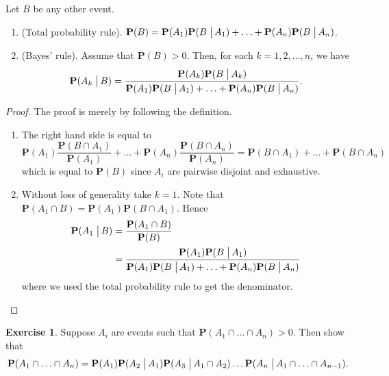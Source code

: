 \documentclass[preprint,  11pt]{amsart}
\theoremstyle{plain} %
\theoremstyle{definition} %
\newtheorem{exercise}[theorem]{Exercise}
\begin{document}
 Let $B$ be any other event.
\begin{enumerate}\setlength\itemsep{6pt}
\item (Total probability rule). $\mathbf{P}(B)=\mathbf{P}(A_{1})\mathbf{P}(B\left.\vphantom{\hbox{\large (}}\right| A_{1})+\ldots +\mathbf{P}(A_{n})\mathbf{P}(B\left.\vphantom{\hbox{\large (}}\right| A_{n})$.
\item (Bayes' rule).  Assume that $\mathbf{P}(B)>0$. Then, for each $k=1,2,\ldots ,n$, we have
$$\mathbf{P}(A_{k}\left.\vphantom{\hbox{\large (}}\right| B)=\frac{\mathbf{P}(A_{k})\mathbf{P}(B\left.\vphantom{\hbox{\large (}}\right| A_{k})}{\mathbf{P}(A_{1})\mathbf{P}(B\left.\vphantom{\hbox{\large (}}\right| A_{1})+\ldots +\mathbf{P}(A_{n})\mathbf{P}(B\left.\vphantom{\hbox{\large (}}\right| A_{n})}.$$
\end{enumerate}
\begin{proof} The proof is merely by following the definition. 
\begin{enumerate}\setlength\itemsep{6pt}
\item The right hand side is equal to
$$
\mathbf{P}(A_{1})\frac{\mathbf{P}(B\cap A_{1})}{\mathbf{P}(A_{1})}+\ldots +\mathbf{P}(A_{n})\frac{\mathbf{P}(B\cap A_{n})}{\mathbf{P}(A_{n})}=\mathbf{P}(B\cap A_{1})+\ldots +\mathbf{P}(B\cap A_{n})
$$
which is equal to $\mathbf{P}(B)$ since $A_{i}$ are pairwise disjoint and exhaustive.
\item Without loss of generality take $k=1$. Note that $\mathbf{P}(A_{1}\cap B)=\mathbf{P}(A_{1})\mathbf{P}(B\cap A_{1})$. Hence
\begin{align*}
\mathbf{P}(A_{1}\left.\vphantom{\hbox{\large (}}\right| B) &= \frac{\mathbf{P}(A_{1}\cap B)}{\mathbf{P}(B)} \\
 &= \frac{\mathbf{P}(A_{1})\mathbf{P}(B\left.\vphantom{\hbox{\large (}}\right| A_{1})}{\mathbf{P}(A_{1})\mathbf{P}(B\left.\vphantom{\hbox{\large (}}\right| A_{1})+\ldots +\mathbf{P}(A_{n})\mathbf{P}(B\left.\vphantom{\hbox{\large (}}\right| A_{n})}
\end{align*}
where we used the total probability rule to get the denominator. \qedhere
\end{enumerate}
\end{proof}
\begin{exercise} Suppose $A_{i}$ are events such that $\mathbf{P}(A_{1}\cap \ldots \cap A_{n})>0$. Then show that $$\mathbf{P}(A_{1}\cap \ldots \cap A_{n})=\mathbf{P}(A_{1})\mathbf{P}(A_{2}\left.\vphantom{\hbox{\large (}}\right| A_{1})\mathbf{P}(A_{3}\left.\vphantom{\hbox{\large (}}\right| A_{1}\cap A_{2})\ldots \mathbf{P}(A_{n}\left.\vphantom{\hbox{\large (}}\right| A_{1}\cap \ldots \cap A_{n-1}).$$
\end{exercise}
\end{document}
